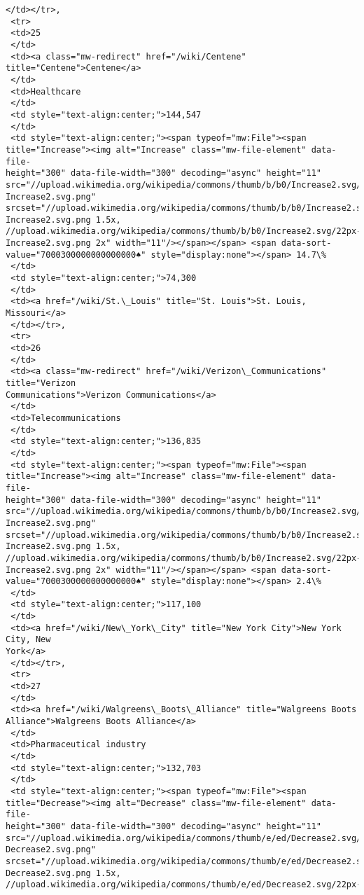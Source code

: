 \documentclass[11pt]{article}
\begin{document}
\begin{tcolorbox}[breakable, size=fbox, boxrule=.5pt, pad at break*=1mm, opacityfill=0]
\begin{Verbatim}[commandchars=\\\{\}]
 </td></tr>,
 <tr>
 <td>25
 </td>
 <td><a class="mw-redirect" href="/wiki/Centene" title="Centene">Centene</a>
 </td>
 <td>Healthcare
 </td>
 <td style="text-align:center;">144,547
 </td>
 <td style="text-align:center;"><span typeof="mw:File"><span
title="Increase"><img alt="Increase" class="mw-file-element" data-file-
height="300" data-file-width="300" decoding="async" height="11"
src="//upload.wikimedia.org/wikipedia/commons/thumb/b/b0/Increase2.svg/11px-
Increase2.svg.png"
srcset="//upload.wikimedia.org/wikipedia/commons/thumb/b/b0/Increase2.svg/17px-
Increase2.svg.png 1.5x,
//upload.wikimedia.org/wikipedia/commons/thumb/b/b0/Increase2.svg/22px-
Increase2.svg.png 2x" width="11"/></span></span> <span data-sort-
value="7000300000000000000♠" style="display:none"></span> 14.7\%
 </td>
 <td style="text-align:center;">74,300
 </td>
 <td><a href="/wiki/St.\_Louis" title="St. Louis">St. Louis, Missouri</a>
 </td></tr>,
 <tr>
 <td>26
 </td>
 <td><a class="mw-redirect" href="/wiki/Verizon\_Communications" title="Verizon
Communications">Verizon Communications</a>
 </td>
 <td>Telecommunications
 </td>
 <td style="text-align:center;">136,835
 </td>
 <td style="text-align:center;"><span typeof="mw:File"><span
title="Increase"><img alt="Increase" class="mw-file-element" data-file-
height="300" data-file-width="300" decoding="async" height="11"
src="//upload.wikimedia.org/wikipedia/commons/thumb/b/b0/Increase2.svg/11px-
Increase2.svg.png"
srcset="//upload.wikimedia.org/wikipedia/commons/thumb/b/b0/Increase2.svg/17px-
Increase2.svg.png 1.5x,
//upload.wikimedia.org/wikipedia/commons/thumb/b/b0/Increase2.svg/22px-
Increase2.svg.png 2x" width="11"/></span></span> <span data-sort-
value="7000300000000000000♠" style="display:none"></span> 2.4\%
 </td>
 <td style="text-align:center;">117,100
 </td>
 <td><a href="/wiki/New\_York\_City" title="New York City">New York City, New
York</a>
 </td></tr>,
 <tr>
 <td>27
 </td>
 <td><a href="/wiki/Walgreens\_Boots\_Alliance" title="Walgreens Boots
Alliance">Walgreens Boots Alliance</a>
 </td>
 <td>Pharmaceutical industry
 </td>
 <td style="text-align:center;">132,703
 </td>
 <td style="text-align:center;"><span typeof="mw:File"><span
title="Decrease"><img alt="Decrease" class="mw-file-element" data-file-
height="300" data-file-width="300" decoding="async" height="11"
src="//upload.wikimedia.org/wikipedia/commons/thumb/e/ed/Decrease2.svg/11px-
Decrease2.svg.png"
srcset="//upload.wikimedia.org/wikipedia/commons/thumb/e/ed/Decrease2.svg/17px-
Decrease2.svg.png 1.5x,
//upload.wikimedia.org/wikipedia/commons/thumb/e/ed/Decrease2.svg/22px-

\end{Verbatim}
\end{tcolorbox}
\end{document}
